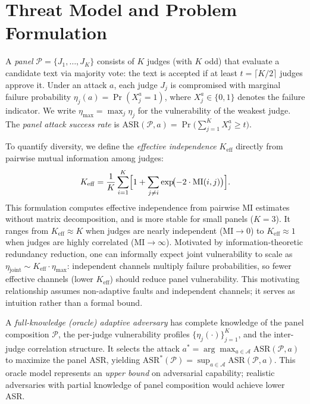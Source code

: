 \section{Threat Model and Problem Formulation}
\label{sec:threat_model}

A \emph{panel} $\mathcal{P} = \{J_1, \ldots, J_K\}$ consists of $K$ judges (with $K$ odd) that evaluate a candidate text via majority vote: the text is accepted if at least $t = \lceil K/2 \rceil$ judges approve it. Under an attack $a$, each judge $J_j$ is compromised with marginal failure probability $\eta_j(a) = \Pr(X_j^a = 1)$, where $X_j^a \in \{0,1\}$ denotes the failure indicator. We write $\eta_{\max} = \max_j \eta_j$ for the vulnerability of the weakest judge. The \emph{panel attack success rate} is $\mathrm{ASR}(\mathcal{P}, a) = \Pr\!\bigl(\sum_{j=1}^K X_j^a \geq t\bigr)$.

To quantify diversity, we define the \emph{effective independence} $K_{\mathrm{eff}}$ directly from pairwise mutual information among judges:
\begin{equation}
\label{eq:keff}
K_{\mathrm{eff}} = \frac{1}{K}\sum_{i=1}^{K} \Bigl[1 + \sum_{j \neq i} \exp\!\bigl(-2 \cdot \mathrm{MI}(i,j)\bigr)\Bigr].
\end{equation}
This formulation computes effective independence from pairwise MI estimates without matrix decomposition, and is more stable for small panels ($K{=}3$). It ranges from $K_{\mathrm{eff}} \approx K$ when judges are nearly independent ($\mathrm{MI} \to 0$) to $K_{\mathrm{eff}} \approx 1$ when judges are highly correlated ($\mathrm{MI} \to \infty$). Motivated by information-theoretic redundancy reduction, one can informally expect joint vulnerability to scale as $\eta_{\mathrm{joint}} \sim K_{\mathrm{eff}} \cdot \eta_{\max}$: independent channels multiply failure probabilities, so fewer effective channels (lower $K_{\mathrm{eff}}$) should reduce panel vulnerability. This motivating relationship assumes non-adaptive faults and independent channels; it serves as intuition rather than a formal bound.

\begin{definition}
\label{def:adversary}
A \emph{full-knowledge (oracle) adaptive adversary} has complete knowledge of the panel composition $\mathcal{P}$, the per-judge vulnerability profiles $\{\eta_j(\cdot)\}_{j=1}^K$, and the inter-judge correlation structure. It selects the attack $a^* = \arg\max_{a \in \mathcal{A}} \mathrm{ASR}(\mathcal{P}, a)$ to maximize the panel ASR, yielding $\mathrm{ASR}^*(\mathcal{P}) = \sup_{a \in \mathcal{A}} \mathrm{ASR}(\mathcal{P}, a)$. This oracle model represents an \emph{upper bound} on adversarial capability; realistic adversaries with partial knowledge of panel composition would achieve lower ASR.
\end{definition}

